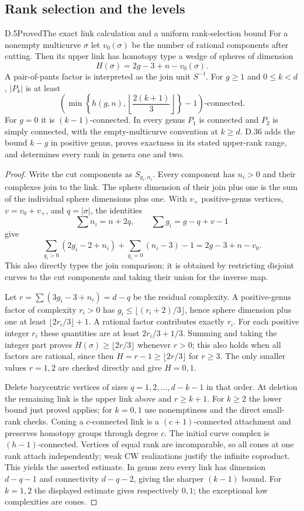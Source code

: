 \subsection{Rank selection and the levels}

\begin{result}{D.5}{Proved}{The exact link calculation and a uniform rank-selection bound}
For a nonempty multicurve $\sigma$ let $v_0(\sigma)$ be the number of rational components after cutting. Then its upper link has homotopy type a wedge of spheres of dimension
\[
 H(\sigma)=2g-3+n-v_0(\sigma).
\]
A pair-of-pants factor is interpreted as the join unit $S^{-1}$. For $g\geq1$ and $0\leq k<d$, $|P_k|$ is at least
\[
 \left(\min\left\{h(g,n),\left\lfloor\frac{2(k+1)}3\right\rfloor\right\}-1\right)\text{-connected}.
\]
For $g=0$ it is $(k-1)$-connected. In every genus $P_1$ is connected and $P_2$ is simply connected, with the empty-multicurve convention at $k\geq d$. D.36 adds the bound $k-g$ in positive genus, proves exactness in its stated upper-rank range, and determines every rank in genera one and two.
\end{result}
\begin{proof}
Write the cut components as $S_{g_i,n_i}$. Every component has $n_i>0$ and their complexes join to the link. The sphere dimension of their join plus one is the sum of the individual sphere dimensions plus one. With $v_+$ positive-genus vertices, $v=v_0+v_+$, and $q=|\sigma|$, the identities
\[
 \sum n_i=n+2q,\qquad \sum g_i=g-q+v-1
\]
give
\[
 \sum_{g_i>0}(2g_i-2+n_i)+\sum_{g_i=0}(n_i-3)-1
 =2g-3+n-v_0.
\]
This also directly types the join comparison; it is obtained by restricting disjoint curves to the cut components and taking their union for the inverse map.

Let $r=\sum(3g_i-3+n_i)=d-q$ be the residual complexity. A positive-genus factor of complexity $r_i>0$ has $g_i\leq\lfloor(r_i+2)/3\rfloor$, hence sphere dimension plus one at least $\lfloor2r_i/3\rfloor+1$. A rational factor contributes exactly $r_i$. For each positive integer $r_i$ these quantities are at least $2r_i/3+1/3$. Summing and taking the integer part proves $H(\sigma)\geq\lfloor2r/3\rfloor$ whenever $r>0$; this also holds when all factors are rational, since then $H=r-1\geq\lfloor2r/3\rfloor$ for $r\geq3$. The only smaller values $r=1,2$ are checked directly and give $H=0,1$.

Delete barycentric vertices of sizes $q=1,2,\ldots,d-k-1$ in that order. At deletion the remaining link is the upper link above and $r\geq k+1$. For $k\geq2$ the lower bound just proved applies; for $k=0,1$ use nonemptiness and the direct small-rank checks. Coning a $c$-connected link is a $(c+1)$-connected attachment and preserves homotopy groups through degree $c$. The initial curve complex is $(h-1)$-connected. Vertices of equal rank are incomparable, so all cones at one rank attach independently; weak CW realizations justify the infinite coproduct. This yields the asserted estimate. In genus zero every link has dimension $d-q-1$ and connectivity $d-q-2$, giving the sharper $(k-1)$ bound. For $k=1,2$ the displayed estimate gives respectively $0,1$; the exceptional low complexities are cones.
\end{proof}


